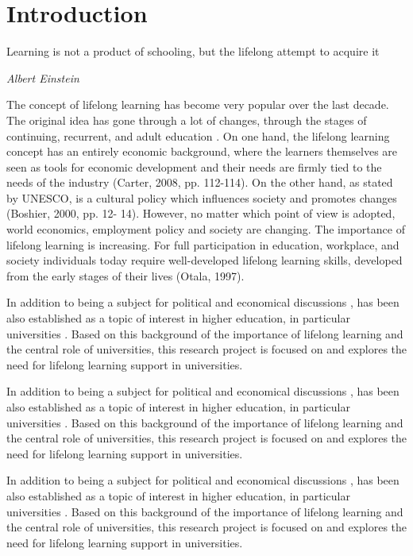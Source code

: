 \chapter{Introduction\label{cha:intro}}
\epigraph{Learning is not a product of schooling, but the lifelong attempt to
acquire it}{\textit{Albert Einstein}}
\noindent
The concept of lifelong learning has become very popular over the last decade.
The original idea has gone through a lot of changes, through the stages of
continuing, recurrent, and adult education \citep{Jarvis2004}. On one hand, the
lifelong learning concept has an entirely economic background, where the
learners themselves are seen as tools for economic development and their needs
are firmly tied to the needs of the industry (Carter, 2008, pp. 112-114). On the
other hand, as stated by UNESCO, \LLLs is a cultural policy which influences
society and promotes changes (Boshier, 2000, pp. 12- 14). However, no matter
which point of view is adopted, world economics, employment policy and society
are changing. The importance of lifelong learning is increasing. For full
participation in education, workplace, and society individuals today require
well-developed lifelong learning skills, developed from the early stages of
their lives (Otala, 1997).

In addition to being a subject for political and economical discussions
\citep{Bagnall2009}, \LLLs has been also established as a topic of interest in
higher education, in particular universities \citep{Knapper2000}. Based on this
background of the importance of lifelong learning and the central role of
universities, this research project is focused on and explores the need for
lifelong learning support in universities.

In addition to being a subject for political and economical discussions
\citep{Bagnall2009}, \LLLs has been also established as a topic of interest in
higher education, in particular universities \citep{Knapper2000}. Based on this
background of the importance of lifelong learning and the central role of
universities, this research project is focused on and explores the need for
lifelong learning support in universities.

In addition to being a subject for political and economical discussions
\citep{Bagnall2009}, \LLLs has been also established as a topic of interest in
higher education, in particular universities \citep{Knapper2000}. Based on this
background of the importance of lifelong learning and the central role of
universities, this research project is focused on and explores the need for
lifelong learning support in universities.

